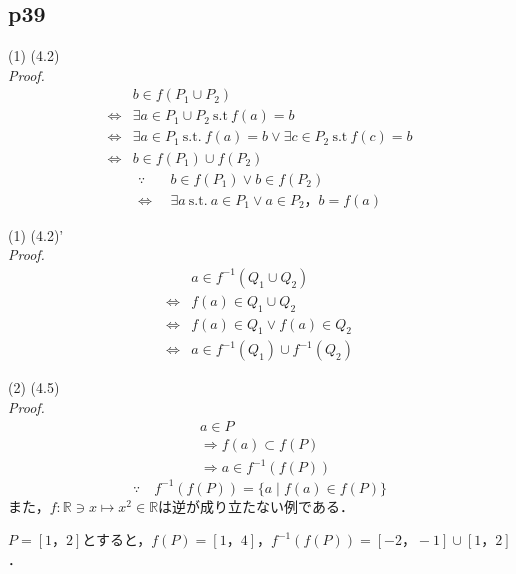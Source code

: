 \documentclass[dvipdfmx,uplatex,11pt]{jsarticle}
\begin{document}
\subsection{p39}
\begin{screen}
    (1) \quad (4.2) \\
{\it Proof.}
\begin{align*}
    & b \in f(P_1 \cup P_2) \\
    \iff & \exists a \in P_1 \cup P_2 ~ \mathrm{s.t} ~ f(a)=b \\
    \iff & \exists a \in P_1 ~\mathrm{s.t.} ~ f(a)=b \lor \exists c \in P_2 ~ \mathrm{s.t} ~ f(c)=b \\
    \iff & b \in f(P_1) \cup f(P_2) 
\end{align*}
\dotfill 
\begin{align*}
\because  \quad  & b \in f(P_1) \lor b \in f(P_2) \\
\iff & \exists a ~ \mathrm{s.t.} ~ a \in P_1 \lor a \in P_2 ，b = f(a)
\end{align*}
\end{screen}
\begin{screen}
    (1) \quad (4.2)' \\
    {\it Proof.}
\begin{align*}
    & a \in f^{-1} (Q_1 \cup Q_2) \\
    \iff & f(a) \in Q_1 \cup Q_2 \\
    \iff & f(a)  \in Q_1 \lor f(a) \in Q_2 \\
    \iff & a \in f^{-1} (Q_1) \cup f^{-1} (Q_2)
\end{align*}
\end{screen}
\begin{screen}
    (2) \quad (4.5) \\
    {\it Proof.}
    \begin{align*}
        & a \in P \\
       & \Longrightarrow  f(a) \subset f(P) \\
       & \Longrightarrow a \in f^{-1} (f(P))
    \end{align*}
    \dotfill 
    \[
        \because \quad f^{-1} (f(P)) = \{ a \mid f(a)\in f(P)\}
        \]
    また，$f \colon \mathbb{R} \ni x \mapsto x^2 \in \mathbb{R}$は逆が成り立たない例である．\par
    $P=[1，2]$とすると，$f(P)=[1，4]$，$f^{-1}(f(P))=[-2，-1] \cup [1，2]$．
\end{screen}
\end{document}
